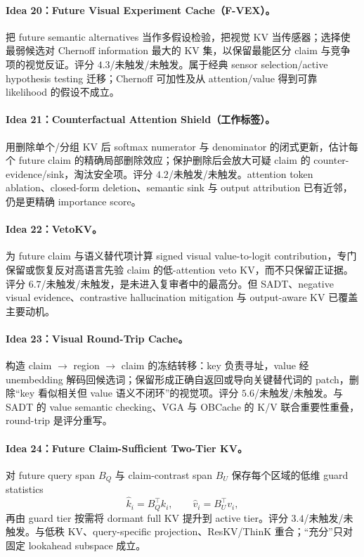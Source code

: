 \documentclass[UTF8,zihao=-4,a4paper]{ctexart}
\begin{document}
\paragraph{Idea 20：Future Visual Experiment Cache（F-VEX）。}
把 future semantic alternatives 当作多假设检验，把视觉 KV 当传感器；选择使最弱候选对 Chernoff information 最大的 KV 集，以保留最能区分 claim 与竞争项的视觉反证。评分 $4.3$/未触发/未触发。属于经典 sensor selection/active hypothesis testing 迁移；Chernoff 可加性及从 attention/value 得到可靠 likelihood 的假设不成立。

\paragraph{Idea 21：Counterfactual Attention Shield（工作标签）。}
用删除单个/分组 KV 后 softmax numerator 与 denominator 的闭式更新，估计每个 future claim 的精确局部删除效应；保护删除后会放大可疑 claim 的 counter-evidence/sink，淘汰安全项。评分 $4.2$/未触发/未触发。attention token ablation、closed-form deletion、semantic sink 与 output attribution 已有近邻，仍是更精确 importance score。

\paragraph{Idea 22：VetoKV。}
为 future claim 与语义替代项计算 signed visual value-to-logit contribution，专门保留或恢复反对高语言先验 claim 的低-attention veto KV，而不只保留正证据。评分 $6.7$/未触发/未触发，是未进入复审者中的最高分。但 SADT、negative visual evidence、contrastive hallucination mitigation 与 output-aware KV 已覆盖主要动机。

\paragraph{Idea 23：Visual Round-Trip Cache。}
构造 claim $\rightarrow$ region $\rightarrow$ claim 的冻结转移：key 负责寻址，value 经 unembedding 解码回候选词；保留形成正确自返回或导向关键替代词的 patch，删除“key 看似相关但 value 语义不闭环”的视觉项。评分 $5.6$/未触发/未触发。与 SADT 的 value semantic checking、VGA 与 OBCache 的 K/V 联合重要性重叠，round-trip 是评分重写。

\paragraph{Idea 24：Future Claim-Sufficient Two-Tier KV。}
对 future query span $B_Q$ 与 claim-contrast span $B_U$ 保存每个区域的低维 guard statistics
\[
\hat k_i=B_Q^\top k_i,\qquad \hat v_i=B_U^\top v_i,
\]
再由 guard tier 按需将 dormant full KV 提升到 active tier。评分 $3.4$/未触发/未触发。与低秩 KV、query-specific projection、ResKV/ThinK 重合；“充分”只对固定 lookahead subspace 成立。
\end{document}
